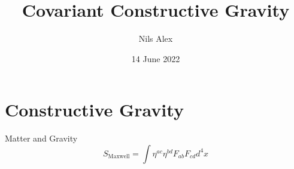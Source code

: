 \documentclass{beamer}
\title{Covariant Constructive Gravity}
\date{14 June 2022}
\author{Nils Alex}
\institute{FAU Erlangen-Nürnberg}
\begin{document}
    \maketitle


    \section{Constructive Gravity}\label{sec:constructive-gravity}
    \begin{frame}{Matter and Gravity}
        \[
            S_\text{Maxwell} = \int \eta^{ac} \eta^{bd} F_{ab} F_{cd} d^4 x
        \]
    \end{frame}
\end{document}
